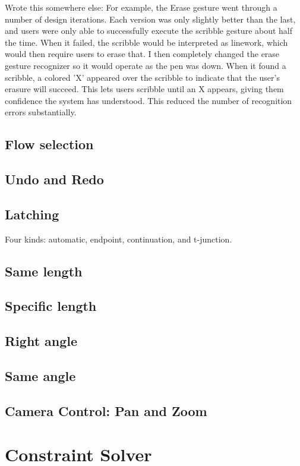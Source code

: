 Wrote this somewhere else: For example, the Erase gesture went through
a number of design iterations. Each version was only slightly better
than the last, and users were only able to successfully execute the
scribble gesture about half the time. When it failed, the scribble
would be interpreted as linework, which would then require users to
erase that. I then completely changed the erase gesture recognizer so
it would operate as the pen was down. When it found a scribble, a
colored 'X' appeared over the scribble to indicate that the user's
erasure will succeed. This lets users scribble until an X appears,
giving them confidence the system has understood. This reduced the
number of recognition errors substantially.

\subsection{Flow selection}

\subsection{Undo and Redo}

\subsection{Latching}

Four kinds: automatic, endpoint, continuation, and t-junction.


\subsection{Same length}

\subsection{Specific length}

\subsection{Right angle}

\subsection{Same angle}

\subsection{Camera Control: Pan and Zoom}

\section{Constraint Solver}
